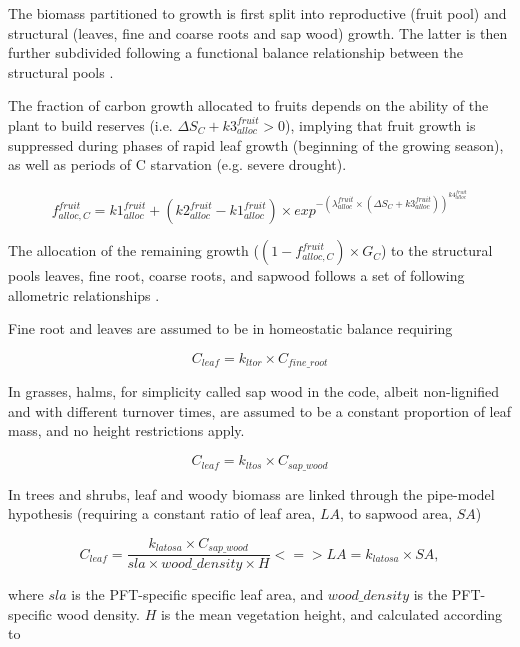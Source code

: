 The biomass partitioned to growth is first split into reproductive (fruit pool) and structural (leaves, fine and coarse roots and sap wood) growth. The latter is then further subdivided following a functional balance relationship between the structural pools \cite{Zaehle:2010cz}. 

The fraction of carbon growth allocated to fruits depends on the ability of the plant to build reserves (i.e. $\Delta S_C + k3^{fruit}_{alloc} > 0$), implying that fruit growth is suppressed during phases of rapid leaf growth (beginning of the growing season), as well as periods of C starvation (e.g. severe drought). 

\begin{equation}
f^{fruit}_{alloc,C} = k1^{fruit}_{alloc} + (k2^{fruit}_{alloc} - k1^{fruit}_{alloc}) \times exp^{-(\lambda^{fruit}_{alloc}\times (\Delta S_C+k3^{fruit}_{alloc}))^{k4^{fruit}_{alloc}}} \label{eq:veg:falloc_fruit}
\end{equation}

The allocation of the remaining growth ($(1-f^{fruit}_{alloc,C}) \times G_C$) to the structural pools leaves, fine root, coarse roots, and sapwood follows a set of following allometric relationships \cite{Zaehle:2010cz}.

Fine root and leaves are assumed to be in homeostatic balance requiring 

\begin{equation}\label{kltor}
C_{leaf} =  k_{ltor} \times C_{fine\_root}
\end{equation}

In grasses, halms, for simplicity called sap wood in the code, albeit non-lignified and with different turnover times, are assumed to be a constant proportion of leaf mass, and no height restrictions apply. 

\begin{equation}
C_{leaf} =  k_{ltos} \times C_{sap\_wood}
\end{equation}

In trees and shrubs, leaf and woody biomass are linked through the pipe-model hypothesis (requiring a constant ratio of leaf area, $LA$, to sapwood area, $SA$)

\begin{equation}
C_{leaf} = \frac{k_{latosa} \times C_{sap\_wood}}{sla \times wood\_density \times H} <=> LA = k_{latosa} \times SA,
\end{equation}

where $sla$ is the PFT-specific specific leaf area, and $wood\_density$ is the PFT-specific wood density. $H$ is the mean vegetation height, and calculated according to 

